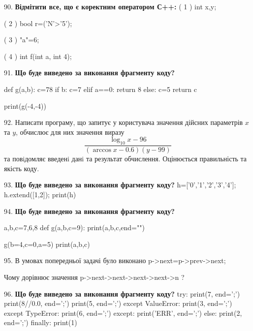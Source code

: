 \documentclass[11pt]{article}
\begin{document}
90. %
\textbf{Відмітити все, що є коректним оператором С++:}
( 1 ) int x,y;

( 2 ) bool r=('N'>'5');

( 3 ) "a"=6;

( 4 ) int f(int a, int 4);
\par\vspace{5mm}

91. \textbf{Що буде виведено за виконання фрагменту коду?}

def g(a,b):
    c=78
    if b:
        c=7
    elif a==0:
         return 8
    else: 
        c=5
    return c

print(g(-4,-4))\par\vspace{5mm}

92. 
Написати програму, що запитує у користувача значення дійсних параметрів $x$ та $y$, обчислює для них значення виразу 
$$\frac{\log_{10} x - 96}{(\arccos x - 0.6) (y - 99)}$$ 
та повiдомляє введенi данi та результат обчислення.
 Оцінюється правильність та якість коду.

\par\vspace{5mm}

93. \textbf{Що буде виведено за виконання фрагменту коду?}
h=['0','1','2','3','4']; h.extend([1,2]); print(h)\par\vspace{5mm}

94. \textbf{Що буде виведено за виконання фрагменту коду?}

a,b,c=7,6,8
def g(a,b,c=9):
    print(a,b,c,end="")

g(b=4,c=0,a=5)
print(a,b,c)

\par\vspace{5mm}

95. 
В умовах попередньої задачі було виконано p->next=p->prev->next;

Чому дорівнює значення p->next->next->next->next->n ?\par\vspace{5mm}

96. \textbf{Що буде виведено за виконання фрагменту коду?}
try:
    print(7, end=';')
    print(8//0.0, end=';')
    print(5, end=';')
except ValueError:
    print(3, end=';')
except TypeError:
    print(6, end=';')
except:
    print('ERR', end=';')
else:
    print(2, end=';')
finally:
    print(1)
\par\vspace{5mm}
\end{document}
